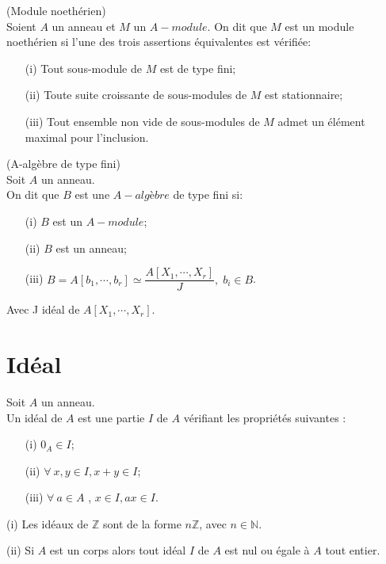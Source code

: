 \begin{maproposition}(Module noethérien) \\
	Soient $A$ un anneau et $M$ un $A-module$. On dit que $M$ est un module noethérien si l'une des trois assertions équivalentes est vérifiée:
	\begin{enumerate}
		\item[(i)] Tout sous-module de $M$ est de type fini;
		\item[(ii)] Toute suite croissante de sous-modules de $M$ est stationnaire;
		\item[(iii)] Tout ensemble non vide de sous-modules de $M$ admet un élément maximal pour l'inclusion.
	\end{enumerate} 
\end{maproposition}
\begin{madefinition}(A-algèbre de type fini)\\
	Soit $A$ un anneau. \\
	On dit que $B$ est une $A-algèbre$ de type fini si:
	\begin{enumerate}
		\item[(i)] $B$ est un $A-module$;
		\item[(ii)] $B$ est un anneau;
		\item[(iii)] $B = A [b_1, \cdots, b_r] \simeq \dfrac{A[X_1, \cdots, X_r]}{J}, \; b_i \in B$.
	\end{enumerate}
	Avec J idéal de $A[X_1, \cdots, X_r]$.
\end{madefinition}
\section{Idéal}
\begin{madefinition}
	Soit $A$ un anneau.\\
	Un idéal de $A$ est une partie $I$ de $A$ vérifiant les propriétés suivantes :
	\begin{enumerate}
		\item[(i)] $0_A \in I$;
		\item[(ii)] $ \forall \ x, y \in I, x+y \in I$;
		\item[(iii)] $ \forall \ a \in A$ , $x \in I , ax \in I$.
	\end{enumerate}
\end{madefinition}
\begin{monexemple}
	\item[(i)] Les idéaux de $\mathbb{Z}$ sont de la forme $n\mathbb{Z}$, avec $n \in \mathbb{N}$.
	\item[(ii)] Si $A$ est un corps alors tout idéal $I$ de $A$ est nul ou égale à $A$ tout entier.
\end{monexemple}
